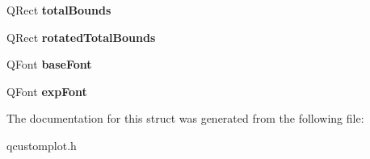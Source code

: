 \begin{DoxyCompactItemize}
Q\+Rect {\bfseries total\+Bounds}
\item 
\mbox{\label{struct_q_c_p_axis_painter_private_1_1_tick_label_data_aa4d38c5ea47c9184a78ee33ae7f1012e}} 
Q\+Rect {\bfseries rotated\+Total\+Bounds}
\item 
\mbox{\label{struct_q_c_p_axis_painter_private_1_1_tick_label_data_a0d4958a706debaa8d19a9b65fc090d56}} 
Q\+Font {\bfseries base\+Font}
\item 
\mbox{\label{struct_q_c_p_axis_painter_private_1_1_tick_label_data_adc10767ebcb719d6927c012a38b9d933}} 
Q\+Font {\bfseries exp\+Font}
\end{DoxyCompactItemize}


The documentation for this struct was generated from the following file\+:\begin{DoxyCompactItemize}
\item 
qcustomplot.\+h\end{DoxyCompactItemize}
